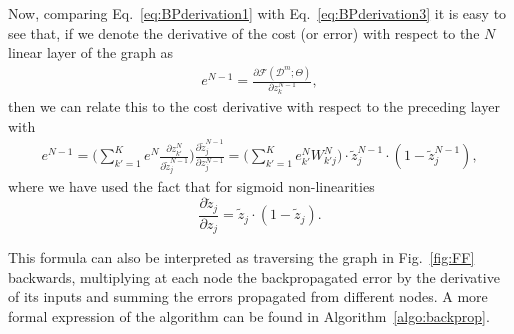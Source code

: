 %
Now, comparing Eq.~\ref{eq:BPderivation1} with Eq.~\ref{eq:BPderivation3} it is easy to see that, if we denote the derivative of the cost (or error) with respect to the $N$ linear layer of the graph as
%
\begin{align}
e^{N-1} = \frac{\partial \mathcal{F}(\mathcal{D}^m;\Theta)}{\partial z_{k}^{N-1}} ,
\label{eq:BPderivation4}
\end{align}
%
\noindent then we can relate this to the cost derivative with respect to the preceding layer with
%
\begin{align}
e^{N-1} = \bigg(\sum_{k'=1}^{K} e^N \frac{\partial z_{k'}^{N}}{\partial \tilde{z}_{j}^{N-1}}\bigg)\frac{\partial \tilde{z}_{j}^{N-1}}{\partial z_{j}^{N-1}} = \bigg(\sum_{k'=1}^{K} e^N_{k'} W^N_{k'j}\bigg)\cdot\tilde{z}_{j}^{N-1}\cdot(1-\tilde{z}_{j}^{N-1}),
\label{eq:chainRulRecursion}
\end{align}
%
where we have used the fact that for sigmoid non-linearities 
%
\begin{equation}
\frac{\partial \tilde{z}_{j}}{\partial z_{j}} = \tilde{z}_{j}\cdot (1-\tilde{z}_{j}).
\end{equation}

This formula can also be interpreted as traversing the graph in Fig.~\ref{fig:FF} backwards, multiplying at each node the backpropagated error by the derivative of its inputs and summing the errors propagated from different nodes. A more formal expression of the algorithm can be found in Algorithm~\ref{algo:backprop}.

